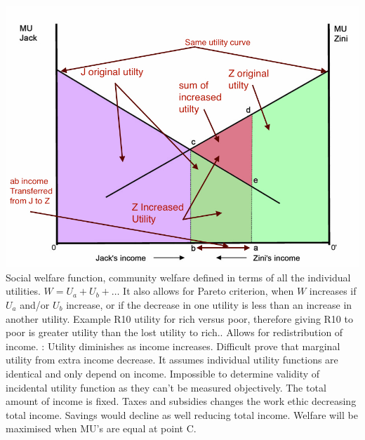 \documentclass[12pt]{examnotes}
\begin{document}
\includegraphics[scale=0.3]{./imgs/51.jpg}
\ra Social welfare function, community welfare defined in terms of all the individual utilities.
\ra $W=U_a+U_b + \dots$
\ra It also allows for Pareto criterion, when $W$ increases if $U_a$ and/or $U_b$ increase, or if the decrease in one utility is less than an increase in another utility.
\ra Example R10 utility for rich versus poor, therefore giving R10 to poor is greater utility than the lost utility to rich.. 
\ra Allows for redistribution of income.
: 
 Utility diminishes as income increases. Difficult prove that marginal utility from extra income decrease.
 It assumes individual utility functions are identical and only depend on income.  Impossible to determine validity of incidental utility function as they can't be measured objectively.
 The total amount of income is fixed. Taxes and subsidies changes the work ethic decreasing total income. Savings would decline as well reducing total income.
\ra Welfare will be maximised when MU's are equal at point C.
\end{document}
